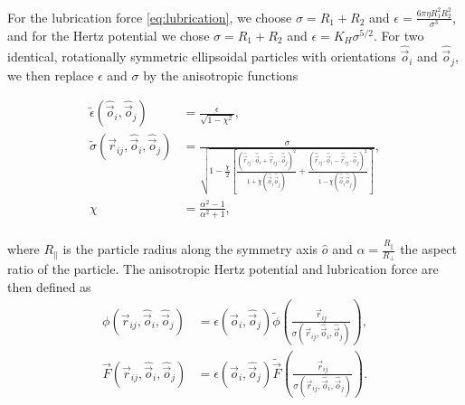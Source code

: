 For the lubrication force \eqref{eq:lubrication}, we choose
${\sigma}=R_1+R_2$ and ${\epsilon}=\frac{6\pi\eta R_1^2 R_2^2}{{\sigma^3}}$, and for the
Hertz potential we chose ${\sigma}=R_1+R_2$ and ${\epsilon}=K_H\sigma^{5/2}$. For two identical, rotationally
symmetric ellipsoidal particles with orientations $\hat{\vec{o}}_i$ and $\hat{\vec{o}}_j$, we then replace $\epsilon$ and $\sigma$ by
the anisotropic functions

\begin{equation}
    \begin{split}
    \tilde\epsilon\left(\hat{\vec{o}}_i, \hat{\vec{o}}_j\right) &= \frac{{\epsilon}}{\sqrt{1-\chi^2}} , \\
    \tilde\sigma\left(\vec{r}_{ij}, \hat{\vec{o}}_i, \hat{\vec{o}}_j\right) &= \frac{{\sigma}}{\sqrt{1-\frac{\chi}{2}\left[ \frac{\left(\hat{\vec{r}}_{ij}\cdot\hat{\vec{o}}_i+\hat{\vec{r}}_{ij}\cdot\hat{\vec{o}}_j\right)^2}{1+\chi\left(\hat{\vec{o}}_i\hat{\vec{o}}_j\right)} + \frac{\left(\hat{\vec{r}}_{ij}\cdot\hat{\vec{o}}_i-\hat{\vec{r}}_{ij}\cdot\hat{\vec{o}}_j\right)^2}{1-\chi\left(\hat{\vec{o}}_i\hat{\vec{o}}_j\right)} \right] }} , \\
    \chi &= \frac{\alpha^2-1}{\alpha^2+1} , \\
    \end{split}
\end{equation}

where $R_{\parallel}$ is the particle radius along the
symmetry axis $\hat{o}$ and $\alpha=\frac{R_{\parallel}}{R_{\perp}}$ the aspect
ratio of the particle. The anisotropic Hertz potential and lubrication
force are then defined as
%
\begin{equation}
    \begin{split}
    \phi\left(\vec{r}_{ij}, \hat{\vec{o}}_i, \hat{\vec{o}}_j\right) &= \epsilon\left(\hat{\vec{o}}_i, \hat{\vec{o}}_j\right) \tilde{\phi}\left(\frac{\vec{r}_{ij}}{\sigma\left(\vec{r}_{ij}, \hat{\vec{o}}_i, \hat{\vec{o}}_j\right)} \right) , \\
    \vec{F}\left(\vec{r}_{ij}, \hat{\vec{o}}_i, \hat{\vec{o}}_j\right) &= \epsilon\left(\hat{\vec{o}}_i, \hat{\vec{o}}_j\right) \tilde{\vec{F}}\left(\frac{\vec{r}_{ij}}{\sigma\left(\vec{r}_{ij}, \hat{\vec{o}}_i, \hat{\vec{o}}_j\right)} \right) .
    \end{split}
\end{equation}

